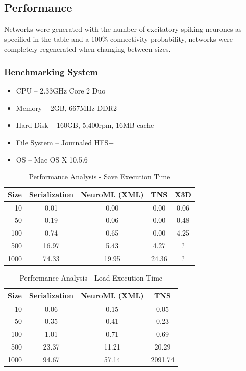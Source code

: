 \documentclass{acm_proc_article-sp}
\begin{document}
\subsection{Performance}
{
Networks were generated with the number of excitatory spiking neurones
as specified in the table and a 100\% connectivity probability,
networks were completely regenerated when changing between sizes.

\subsubsection{Benchmarking System}

\begin{itemize}
\item {
CPU  {--} 2.33GHz Core 2 Duo
}
\item {
Memory  {--} 2GB, 667MHz DDR2
}
\item {
Hard Disk {--} 160GB, 5,400rpm, 16MB cache
}
\item {
File System {--} Journaled HFS+
}
\item {
OS {--} Mac OS X 10.5.6
}
\end{itemize}

\begin{table}[t]
\centering
\begin{tabular}{|r || c | c | c | c |}
\hline
Size & Serialization & NeuroML (XML) & TNS & X3D \\
\hline
10 & 0.01 & 0.00 & 0.00 & 0.06 \\
50 & 0.19 & 0.06 & 0.00 & 0.48 \\
100 & 0.74 & 0.65 & 0.00 & 4.25 \\
500 & 16.97 & 5.43 & 4.27 & ? \\
1000 & 74.33 & 19.95 & 24.36 & ? \\
\hline
\end{tabular}
\caption{Performance Analysis - Save Execution Time}
\label{persistence:save}
\end{table}

\begin{table}[t]
\centering
\begin{tabular}{|r || c | c | c |}
\hline
Size & Serialization & NeuroML (XML) & TNS \\
\hline
10 & 0.06 & 0.15 & 0.05 \\
50 & 0.35 & 0.41 & 0.23 \\
100 & 1.01 & 0.71 & 0.69 \\
500 & 23.37 & 11.21 & 20.29 \\
1000 & 94.67 & 57.14 & 2091.74 \\
\hline
\end{tabular}
\caption{Performance Analysis - Load Execution Time}
\label{persistence:load}
\end{table}

}
\end{document}
